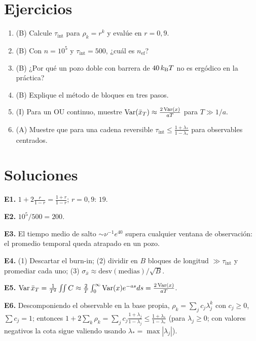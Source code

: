 \documentclass[11pt,a4paper]{article}
\begin{document}

\section{Ejercicios}
\begin{enumerate}[label=\textbf{E\arabic*.}]
\item (B) Calcule $\tau_{\text{int}}$ para $\rho_k=r^k$ y evalúe en $r=0{,}9$.
\item (B) Con $n=10^5$ y $\tau_{\text{int}}=500$, ¿cuál es $n_{\text{ef}}$?
\item (B) ¿Por qué un pozo doble con barrera de $40\,k_{\mathrm B} T$ no es ergódico en la práctica?
\item (B) Explique el método de bloques en tres pasos.
\item (I) Para un OU continuo, muestre $\operatorname{Var}(\bar x_T)\approx\frac{2\operatorname{Var}(x)}{aT}$ para $T\gg1/a$.
\item (A) Muestre que para una cadena reversible $\tau_{\text{int}}\le\frac{1+\lambda_*}{1-\lambda_*}$ para observables centrados.
\end{enumerate}

\section{Soluciones}
\begin{solucion}
\textbf{E1.} $1+2\frac{r}{1-r}=\frac{1+r}{1-r}$; $r=0{,}9$: $19$.

\textbf{E2.} $10^5/500=200$.

\textbf{E3.} El tiempo medio de salto $\sim\nu^{-1}e^{40}$ supera cualquier ventana de observación: el promedio temporal queda atrapado en un pozo.

\textbf{E4.} (1) Descartar el burn-in; (2) dividir en $B$ bloques de longitud $\gg\tau_{\text{int}}$ y promediar cada uno; (3) $\sigma_{\bar x}\approx\text{desv}(\text{medias})/\sqrt B$.

\textbf{E5.} $\operatorname{Var}\bar x_T=\frac1{T^2}\iint C\approx\frac2T\int_0^\infty\operatorname{Var}(x)e^{-as}ds=\frac{2\operatorname{Var}(x)}{aT}$.

\textbf{E6.} Descomponiendo el observable en la base propia, $\rho_k=\sum_jc_j\lambda_j^k$ con $c_j\ge0$, $\sum c_j=1$; entonces $1+2\sum_k\rho_k=\sum_jc_j\frac{1+\lambda_j}{1-\lambda_j}\le\frac{1+\lambda_*}{1-\lambda_*}$ (para $\lambda_j\ge0$; con valores negativos la cota sigue valiendo usando $\lambda_*=\max|\lambda_j|$).
\end{solucion}
\end{document}
